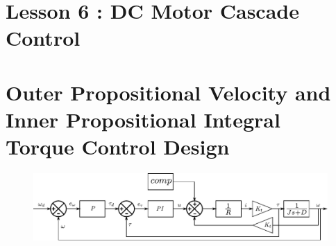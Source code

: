 \documentclass[12pt,a4paper]{article}
\begin{document}
	\section*{\centering Lesson 6 : DC Motor Cascade Control}

	\section{Outer Propositional Velocity and Inner Propositional Integral Torque Control Design }
	\begin{figure}[h]
		\centering
		\includegraphics[scale=0.9]{src/img/fig1.pdf}
	\end{figure}
\end{document}
